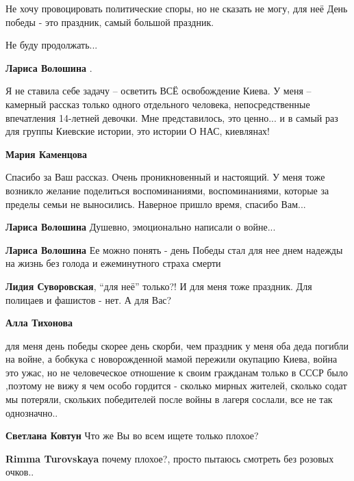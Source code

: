 \begin{itemize}
Не хочу провоцировать политические споры, но не сказать не могу, для неё День
победы - это праздник, самый большой праздник.

Не буду продолжать...

\begin{itemize} %
\textbf{Лариса Волошина} . 

Я не ставила себе задачу – осветить ВСЁ освобождение Киева. У меня – камерный
рассказ только одного отдельного человека, непосредственные впечатления
14-летней девочки. Мне представилось, это ценно... и в самый раз для группы
Киевские истории, это истории О НАС, киевлянах!

\begin{itemize} %
\textbf{Мария Каменцова} 

Спасибо за Ваш рассказ. Очень проникновенный и настоящий. У меня тоже возникло
желание поделиться воспоминаниями, воспоминаниями, которые за пределы семьи не
выносились. Наверное пришло время, спасибо Вам...

\end{itemize} %

\textbf{Лариса Волошина}
Душевно, эмоционально написали о войне...

\textbf{Лариса Волошина} Ее можно понять - день Победы стал для нее днем надежды на жизнь без голода и ежеминутного страха смерти

\begin{itemize} %
\textbf{Лидия Суворовская}, \enquote{для неё} только?! И для меня тоже праздник. Для полицаев и фашистов - нет.
А для Вас?

\textbf{Алла Тихонова} 

для меня день победы скорее день скорби, чем праздник у меня оба деда погибли
на войне, а бобкука с новорожденной мамой пережили окупацию Киева, война это
ужас, но не человеческое отношение к своим гражданам только в СССР было
,поэтому не вижу я чем особо гордится - сколько мирных жителей, сколько содат мы
потеряли, скольких победителей после войны в лагеря сослали, все не так
однозначно..

\textbf{Светлана Ковтун} Что же Вы во всем ищете только плохое?

\textbf{Rimma Turovskaya} почему плохое?, просто пытаюсь смотреть без розовых очков..
\end{itemize} %


\end{itemize}
\end{itemize}
